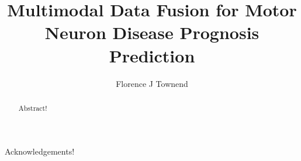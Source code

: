 
\title{Multimodal Data Fusion for Motor Neuron Disease Prognosis Prediction}
\author{Florence J Townend}

\maketitle
\makedeclaration

\begin{abstract} %
Abstract!
\end{abstract}



\begin{acknowledgements}
Acknowledgements!
\end{acknowledgements}

\setcounter{tocdepth}{2} 

\tableofcontents
\listoffigures
\listoftables

